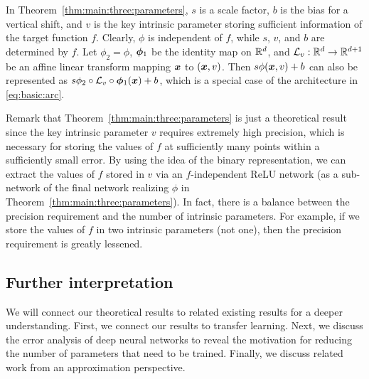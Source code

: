 \documentclass[nohyperref]{article}
\theoremstyle{plain}
\theoremstyle{definition}
\theoremstyle{remark}
\begin{document}
In Theorem~\ref{thm:main:three:parameters}, $s$ is a scale factor, $b$ is the bias for a vertical shift, and $v$ is the key intrinsic parameter storing sufficient information of the target function $f$.
Clearly, $\phi$ is independent of  $f$,  while $s$, $v$, and $b$ are determined by $f$.
Let $\phi_2=\phi$, ${\bm{\phi}}_1$ be the identity map on $\R^d$, and $\calL_v:\R^d\to\R^{d+1}$ be an affine linear transform mapping ${\bm{x}}$ to $({\bm{x}},v)$. Then $s\phi({\bm{x}},v)+b$ can also be represented as  $s\phi_2\circ{\mathcal{L}}_v\circ{\bm{\phi}}_1({\bm{x}})+b$, which is a special case of the architecture in \eqref{eq:basic:arc}.

Remark that Theorem~\ref{thm:main:three:parameters} is just a theoretical result since the key intrinsic parameter $v$ requires extremely high precision, which is necessary for storing the values of $f$ at sufficiently many points within a sufficiently small error. 
By using the idea of the binary representation,
we can extract the values of $f$ stored in $v$ via an $f$-independent ReLU network (as a sub-network of the final network realizing $\phi$ in Theorem~\ref{thm:main:three:parameters}).
In fact,
there is a balance between the precision requirement and the number of intrinsic parameters. For example, if we store the values of $f$ in two intrinsic parameters (not one), then the precision requirement is greatly lessened.


\subsection{Further interpretation}\label{sec:further:interpretation}

We will connect our theoretical results to
related existing results for a deeper understanding.
First, we connect our results to transfer learning. Next, we discuss the error analysis of deep neural networks to reveal
the motivation for reducing the number of parameters that need to be trained. Finally, we discuss related work from an approximation perspective.

\end{document}
